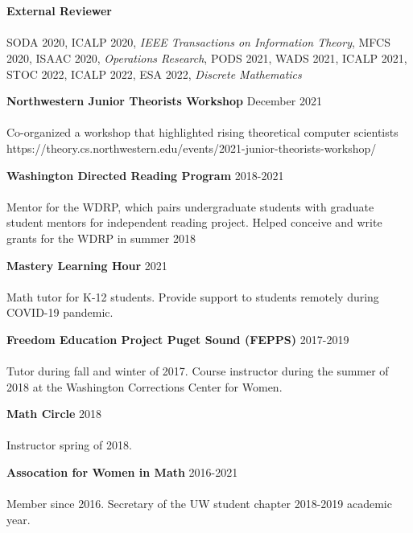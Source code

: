\documentclass[12 pt]{article}
\newcommand{\lineunder}{\vspace*{-8pt} \\ \hspace*{-18pt} \hrulefill \\}
\newcommand{\header}[1]{{\hspace*{-15pt}\vspace*{6pt} \selectfont{\textsc{#1}}} \vspace*{-6pt} \lineunder}
\newcommand{\employer}[3]{{ \textbf{#1} \hfill #2 \\ #3\\  }}
\newenvironment{achievements}{\begin{list}{$\bullet$}{\topsep 0pt \itemsep -2pt}}{\vspace*{4pt}\end{list}}
\begin{document}
\bigskip




\header{Service and  outreach}

\bigskip
\employer{External Reviewer}{}{~}
\vspace{-5mm}
SODA 2020, ICALP 2020, \emph{IEEE Transactions on Information Theory}, MFCS 2020, ISAAC 2020, \emph{Operations Research}, 
PODS 2021, WADS 2021, ICALP 2021, STOC 2022, ICALP 2022, ESA 2022, \emph{Discrete Mathematics}


\bigskip
\employer{Northwestern Junior Theorists Workshop}{December 2021}{~}
\vspace{-5mm}
Co-organized a workshop that highlighted rising theoretical computer scientists
https://theory.cs.northwestern.edu/events/2021-junior-theorists-workshop/

\bigskip
\employer{Washington Directed Reading Program}{2018-2021}{~}
\vspace{-5mm}
Mentor for the WDRP, which pairs undergraduate students with graduate student mentors for independent reading project.
Helped conceive and write grants for the WDRP in summer 2018

\bigskip
\employer{Mastery Learning Hour}{2021}{~}
\vspace{-5mm}
Math tutor for K-12 students. Provide support to students remotely during COVID-19 pandemic.

\bigskip
\employer{Freedom Education Project Puget Sound (FEPPS)}{2017-2019}{~}
\vspace{-5mm}
Tutor during fall and winter of 2017. Course instructor during the summer of 2018 at the Washington Corrections Center for Women.
\bigskip

\employer{Math Circle}{2018}{~}
\vspace{-5mm}
Instructor spring of 2018.


\bigskip
\employer{Assocation for Women in Math}{2016-2021}{~}
\vspace{-5mm}
Member since 2016. Secretary of the UW student chapter 2018-2019 academic year.
\end{document}
